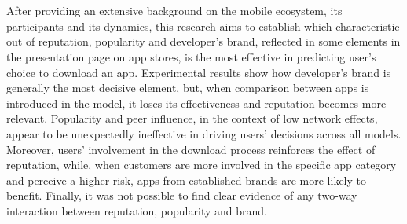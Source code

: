 

\begin{center}

\end{center}

\begin{center}
{{\bf\fontsize{14pt}{14.5pt}\selectfont {Abstract}}}
\end{center}

\doublespacing
{}



\begin{center}
	\begin{doublespace}
{\fontsize{14pt}{14.5pt}\selectfont {Determinants of Download on Mobile App Stores - An Empirical Analysis}}\\
		{\fontsize{14pt}{14.5pt}\selectfont {Luca Bontempi}}\\
	\end{doublespace}
\end{center}

\setlength{\parindent}{0cm}
After providing an extensive background on the mobile ecosystem, its participants and its dynamics, this research aims to establish which characteristic out of reputation, popularity and developer's brand, reflected in some elements in the presentation page on app stores, is the most effective in predicting user's choice to download an app. Experimental results show how developer's brand is generally the most decisive element, but, when comparison between apps is introduced in the model, it loses its effectiveness and reputation becomes more relevant. Popularity and peer influence, in the context of low network effects, appear to be unexpectedly ineffective in driving users' decisions across all models. Moreover, users' involvement in the download process reinforces the effect of reputation, while, when customers are more involved in the specific app category and perceive a higher risk, apps from established brands are more likely to benefit. Finally, it was not possible to find clear evidence of any two-way interaction between reputation, popularity and brand.
